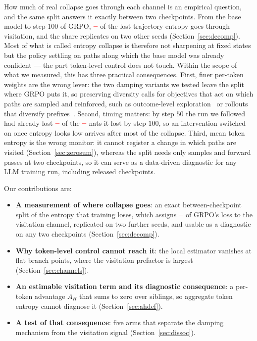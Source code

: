 \documentclass[runningheads]{llncs}
\newcommand{\AH}{A_{H}}
\providecommand{\PENDING}{\textcolor{red}{\textbf{--}}}
\newcommand{\num}[1]{\ifcsname #1\endcsname\csname #1\endcsname\else\PENDING\fi}
\begin{document}
How much of real collapse goes through each channel is an empirical question, and the
same split answers it exactly between two checkpoints. From the base model to step
$100$ of GRPO, $\num{DecGrpoShare}$ of the lost trajectory entropy goes through
visitation, and the share replicates on two other seeds (Section~\ref{sec:decomp}).
Most of what is called entropy collapse is therefore not sharpening at fixed states but
the policy settling on paths along which the base model was already confident --- the
part token-level control does not touch. Within the scope of what we measured, this has
three practical consequences. First, finer per-token weights are the wrong lever: the
two damping variants we tested leave the split where GRPO puts it, so preserving
diversity calls for objectives that act on which paths are sampled and reinforced,
such as outcome-level exploration~\cite{song2025outcome} or rollouts that diversify
prefixes~\cite{cao2026treeadv}. Second, timing matters: by step $50$ the run we
followed had already lost $\num{DecSecSignedADH}$ of the $\num{DecSignedDH}$ nats it
lost by step $100$, so an intervention switched on once entropy looks low arrives after
most of the collapse. Third, mean token entropy is the wrong monitor: it cannot
register a change in which paths are visited (Section~\ref{sec:zerosum}), whereas the
split needs only samples and forward passes at two checkpoints, so it can serve as a
data-driven diagnostic for any LLM training run, including released checkpoints.

Our contributions are:
\begin{itemize}
\item \textbf{A measurement of where collapse goes}: an exact between-checkpoint split
      of the entropy that training loses, which assigns $\num{DecGrpoShare}$ of GRPO's
      loss to the visitation channel, replicated on two further seeds, and usable as a
      diagnostic on any two checkpoints (Section~\ref{sec:decomp}).
\item \textbf{Why token-level control cannot reach it}: the local estimator vanishes
      at flat branch points, where the visitation prefactor is largest
      (Section~\ref{sec:channels}).
\item \textbf{An estimable visitation term and its diagnostic consequence}: a per-token
      advantage $\AH$ that sums to zero over siblings, so aggregate token entropy
      cannot diagnose it (Section~\ref{sec:ahdef}).
\item \textbf{A test of that consequence}: five arms that separate the damping
      mechanism from the visitation signal (Section~\ref{sec:dissoc}).
\end{itemize}
\end{document}
